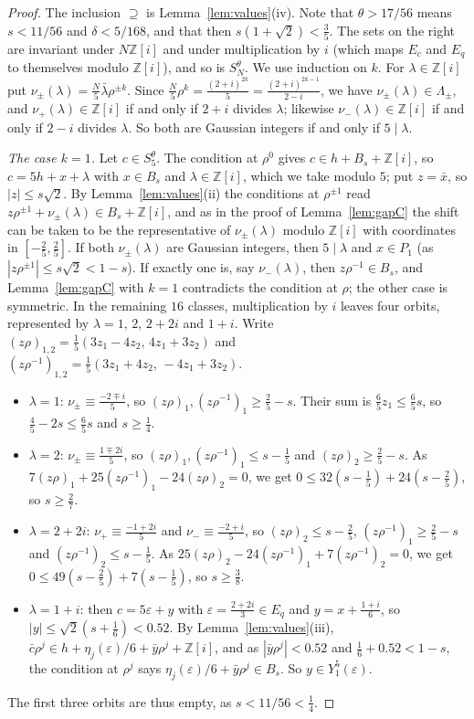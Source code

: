 \documentclass[11pt,a4paper]{amsart}
\theoremstyle{remark}
\newcommand{\Z}{\mathbb{Z}}
\begin{document}
\begin{proof}
The inclusion $\supseteq$ is Lemma~\ref{lem:values}(iv). Note that $\theta>17/56$ means $s<11/56$ and
$\delta<5/168$, and that then $s(1+\sqrt2)<\frac35$. The sets on the right are invariant under $N\Z[i]$ and under
multiplication by $i$ (which maps $E_c$ and $E_q$ to themselves modulo $\Z[i]$), and so is $S_N^\theta$. We use
induction on $k$. For $\lambda\in\Z[i]$ put $\nu_\pm(\lambda)=\frac N5\bar\lambda\rho^{\pm k}$. Since $\frac
N5\rho^k=\frac{(2+i)^{2k}}5=\frac{(2+i)^{2k-1}}{2-i}$, we have $\nu_\pm(\lambda)\in\Lambda_\pm$, and
$\nu_+(\lambda)\in\Z[i]$ if and only if $2+i$ divides $\lambda$; likewise $\nu_-(\lambda)\in\Z[i]$ if and only if
$2-i$ divides $\lambda$. So both are Gaussian integers if and only if $5\mid\lambda$.

\emph{The case $k=1$.} Let $c\in S_5^\theta$. The condition at $\rho^0$ gives $c\in h+B_s+\Z[i]$, so
$c=5h+x+\lambda$ with $x\in B_s$ and $\lambda\in\Z[i]$, which we take modulo $5$; put $z=\bar x$, so $|z|\le s\sqrt2$.
By Lemma~\ref{lem:values}(ii) the conditions at $\rho^{\pm1}$ read $z\rho^{\pm1}+\nu_\pm(\lambda)\in B_s+\Z[i]$, and
as in the proof of Lemma~\ref{lem:gapC} the shift can be taken to be the representative of $\nu_\pm(\lambda)$
modulo $\Z[i]$ with coordinates in $[-\frac25,\frac25]$. If both $\nu_\pm(\lambda)$ are Gaussian integers, then
$5\mid\lambda$ and $x\in P_1$ (as $|z\rho^{\pm1}|\le s\sqrt2<1-s$). If exactly one is, say $\nu_-(\lambda)$, then
$z\rho^{-1}\in B_s$, and Lemma~\ref{lem:gapC} with $k=1$ contradicts the condition at $\rho$; the other case is
symmetric. In the remaining $16$ classes, multiplication by $i$ leaves four orbits, represented by $\lambda=1$, $2$,
$2+2i$ and $1+i$. Write $(z\rho)_{1,2}=\frac15(3z_1-4z_2,\,4z_1+3z_2)$ and
$(z\rho^{-1})_{1,2}=\frac15(3z_1+4z_2,\,-4z_1+3z_2)$.
\begin{itemize}
\item $\lambda=1$: $\nu_\pm\equiv\frac{-2\mp i}5$, so $(z\rho)_1,(z\rho^{-1})_1\ge\frac25-s$. Their sum is
$\frac65z_1\le\frac65s$, so $\frac45-2s\le\frac65s$ and $s\ge\frac14$.
\item $\lambda=2$: $\nu_\pm\equiv\frac{1\mp2i}5$, so $(z\rho)_1,(z\rho^{-1})_1\le s-\frac15$ and
$(z\rho)_2\ge\frac25-s$. As $7(z\rho)_1+25(z\rho^{-1})_1-24(z\rho)_2=0$, we get $0\le32(s-\frac15)+24(s-\frac25)$, so
$s\ge\frac27$.
\item $\lambda=2+2i$: $\nu_+\equiv\frac{-1+2i}5$ and $\nu_-\equiv\frac{-2+i}5$, so $(z\rho)_2\le s-\frac25$,
$(z\rho^{-1})_1\ge\frac25-s$ and $(z\rho^{-1})_2\le s-\frac15$. As $25(z\rho)_2-24(z\rho^{-1})_1+7(z\rho^{-1})_2=0$, we
get $0\le49(s-\frac25)+7(s-\frac15)$, so $s\ge\frac38$.
\item $\lambda=1+i$: then $c=5\varepsilon+y$ with $\varepsilon=\frac{2+2i}3\in E_q$ and $y=x+\frac{1+i}6$, so
$|y|\le\sqrt2(s+\frac16)<0.52$. By Lemma~\ref{lem:values}(iii), $\bar c\rho^j\in h+\eta_j(\varepsilon)/6+\bar
y\rho^j+\Z[i]$, and as $|\bar y\rho^j|<0.52$ and $\frac16+0.52<1-s$, the condition at $\rho^j$ says
$\eta_j(\varepsilon)/6+\bar y\rho^j\in B_s$. So $y\in Y^5_1(\varepsilon)$.
\end{itemize}
The first three orbits are thus empty, as $s<11/56<\frac14$.


\end{proof}
\end{document}
